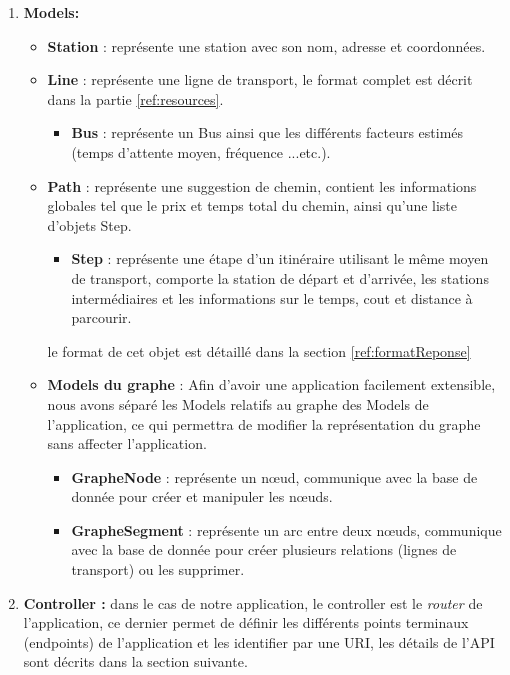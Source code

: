 \begin{enumerate}
	\item \textbf{Models:}
	      \begin{itemize}
	      	\item \textbf{Station} : représente une station avec son nom, adresse et coordonnées.
	      	\item \textbf{Line} : représente une ligne de transport, le format complet est décrit dans la partie \ref{ref:resources}.
	      	      \begin{itemize}
	      	      	\item \textbf{Bus} : représente un Bus ainsi que les différents facteurs estimés (temps d'attente moyen, fréquence ...etc.).
	      	      \end{itemize}
	      	\item \textbf{Path} : représente une suggestion de chemin, contient les informations globales tel que le prix et temps total du chemin, ainsi qu'une liste d'objets Step.
	      	      \begin{itemize}
	      	      	\item \textbf{Step} : représente une étape d'un itinéraire utilisant le même moyen de transport, comporte la station de départ et d'arrivée, les stations intermédiaires et les informations sur le temps, cout et distance à parcourir.
	      	      \end{itemize}
	      	      le format de cet objet est détaillé dans la section \ref{ref:formatReponse}
	      	\item \textbf{Models du graphe} : 
	      	      Afin d'avoir une application facilement extensible, nous avons séparé les Models relatifs au graphe des Models de l'application, ce qui permettra de modifier la représentation du graphe sans affecter l'application.
	      	      \begin{itemize}
	      	      	\item \textbf{GrapheNode} : représente un nœud, communique avec la base de donnée pour créer et manipuler les nœuds.
	      	      	\item \textbf{GrapheSegment} : représente un arc entre deux nœuds, communique avec la base de donnée pour créer plusieurs relations (lignes de transport) ou les supprimer.
	      	      \end{itemize}
	      \end{itemize}
	      	
	\item \textbf{Controller :} dans le cas de notre application, le controller est le \emph{router} de l'application, ce dernier permet de définir les différents points terminaux (endpoints) de l'application et les identifier par une URI, les détails de l'API sont décrits dans la section suivante.
	      

\end{enumerate}
